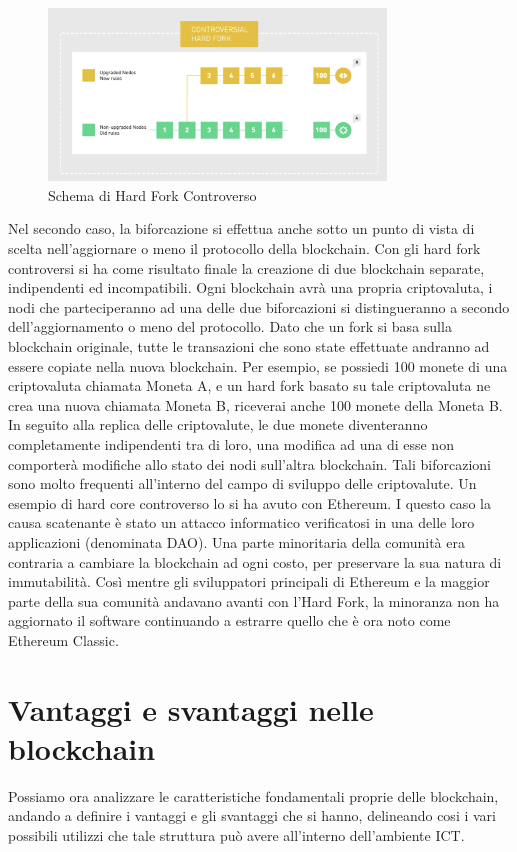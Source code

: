 \begin{figure}[h]
    \centering
    \includegraphics[width=0.8\textwidth]{img/controversial-fork.png}
    \caption{Schema di Hard Fork Controverso}
    \label{fig:controversial-fork}
\end{figure}
Nel secondo caso, la biforcazione si effettua anche sotto un punto di vista di scelta nell'aggiornare o meno il protocollo della blockchain. Con gli hard fork controversi si ha come risultato finale la creazione di due blockchain separate, indipendenti ed incompatibili. Ogni blockchain avrà una propria criptovaluta, i nodi che parteciperanno ad una delle due biforcazioni si distingueranno a secondo dell'aggiornamento o meno del protocollo. 
Dato che un fork si basa sulla blockchain originale, tutte le transazioni che sono state effettuate andranno ad essere copiate nella nuova blockchain. Per esempio, se possiedi 100 monete di una criptovaluta chiamata Moneta A, e un hard fork basato su tale criptovaluta ne crea una nuova chiamata Moneta B, riceverai anche 100 monete della Moneta B. In seguito alla replica delle criptovalute, le due monete diventeranno completamente indipendenti tra di loro, una modifica ad una di esse non comporterà modifiche allo stato dei nodi sull'altra blockchain. Tali biforcazioni sono molto frequenti all'interno del campo di sviluppo delle criptovalute. Un esempio di hard core controverso lo si ha avuto con Ethereum. I questo caso la causa scatenante è stato un attacco informatico verificatosi in una delle loro applicazioni (denominata DAO). Una parte minoritaria della comunità era contraria a cambiare la blockchain ad ogni costo, per preservare la sua natura di immutabilità. Così mentre gli sviluppatori principali di Ethereum e la maggior parte della sua comunità andavano avanti con l’Hard Fork, la minoranza non ha aggiornato il software continuando a estrarre quello che è ora noto come Ethereum Classic.
\newpage
\section{Vantaggi e svantaggi nelle blockchain}
Possiamo ora analizzare le caratteristiche fondamentali proprie delle blockchain, andando a definire i vantaggi e gli svantaggi che si hanno, delineando cosi i vari possibili utilizzi che tale struttura può avere all'interno dell'ambiente ICT. 
